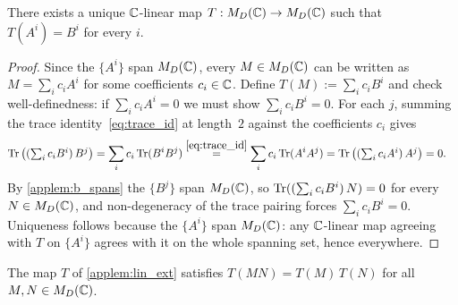 \begin{applem}\label{applem:lin_ext}
    There exists a unique $\mathbb{C}$-linear map $T : M_D(\mathbb{C}) \to M_D(\mathbb{C})$ such that $T(A^i) = B^i$ for every $i$.
\end{applem}

\begin{proof}
    Since the $\{A^i\}$ span $M_D(\mathbb{C})$, every $M \in M_D(\mathbb{C})$ can be written as $M = \sum_i c_i A^i$ for some coefficients $c_i \in \mathbb{C}$. Define $T(M) := \sum_i c_i B^i$ and check well-definedness: if $\sum_i c_i A^i = 0$ we must show $\sum_i c_i B^i = 0$. For each $j$, summing the trace identity~\eqref{eq:trace_id} at length~$2$ against the coefficients $c_i$ gives
    \begin{align}
        \operatorname{Tr}\left((\textstyle\sum_i c_i B^i)\, B^j\right)
         &=  \sum_i c_i \operatorname{Tr}(B^i B^j)
        \stackrel{\eqref{eq:trace_id}}{=}  \sum_i c_i \operatorname{Tr}(A^i A^j)
        =  \operatorname{Tr}\left((\textstyle\sum_i c_i A^i)\, A^j\right) =  0.
    \end{align}
    By \cref{applem:b_spans} the $\{B^j\}$ span $M_D(\mathbb{C})$, so $\operatorname{Tr}((\sum_i c_i B^i)\, N) = 0$ for every $N \in M_D(\mathbb{C})$, and non-degeneracy of the trace pairing forces $\sum_i c_i B^i = 0$. Uniqueness follows because the $\{A^i\}$ span $M_D(\mathbb{C})$: any $\mathbb{C}$-linear map agreeing with $T$ on $\{A^i\}$ agrees with it on the whole spanning set, hence everywhere.
\end{proof}

\begin{applem}[Multiplicativity]\label{applem:mult}
    The map $T$ of \cref{applem:lin_ext} satisfies $T(MN) = T(M)\,T(N)$ for all $M, N \in M_D(\mathbb{C})$.
\end{applem}

